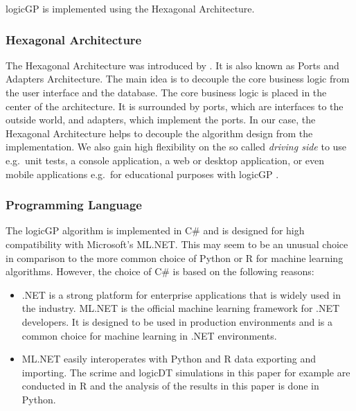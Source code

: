 \documentclass[dvipsnames,format=sigconf,anonymous=false,review=false]{acmart}
\begin{document}
logicGP is implemented using the Hexagonal Architecture. 


\subsubsection{Hexagonal Architecture}

The Hexagonal Architecture was introduced by \citet{Cockburn2005}. It is also known as Ports and Adapters Architecture. The main idea is to decouple the core business logic from the user interface and the database. The core business logic is placed in the center of the architecture. It is surrounded by ports, which are interfaces to the outside world, and adapters, which implement the ports. In our case, the Hexagonal Architecture helps to decouple the algorithm design from the implementation. We also gain high flexibility on the so called \emph{driving side} to use e.g.\ unit tests, a console application, a web or desktop application, or even mobile applications e.g.\ for educational purposes with logicGP \citep[see e.g.][]{Nunkesser2022}.


\subsubsection{Programming Language}

The logicGP algorithm is implemented in C\# and is designed for high compatibility with Microsoft's ML.NET. This may seem to be an unusual choice in comparison to the more common choice of Python or R for machine learning algorithms. However, the choice of C\# is based on the following reasons:

\begin{itemize}
  \item .NET is a strong platform for enterprise applications that is widely used in the industry. ML.NET is the official machine learning framework for .NET developers. It is designed to be used in production environments and is a common choice for machine learning in .NET environments.
  \item ML.NET easily interoperates with Python and R data exporting and importing. The scrime and logicDT simulations in this paper for example are conducted in R and the analysis of the results in this paper is done in Python.   
\end{itemize}
\end{document}
